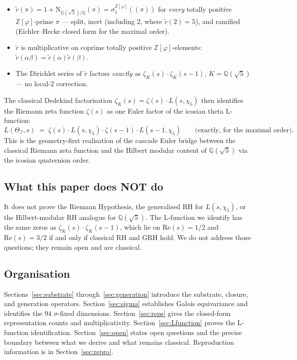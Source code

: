 \documentclass[11pt,a4paper]{article}
\theoremstyle{definition}
\theoremstyle{remark}
\newcommand{\Z}{\mathbb{Z}}
\newcommand{\Q}{\mathbb{Q}}
\newcommand{\II}{\mathcal{I}}
\newcommand{\NQ}{\mathrm{N}_{\mathbb{Q}(\sqrt{5})/\mathbb{Q}}}
\newcommand{\Zphi}{\Z[\varphi]}
\begin{document}
\begin{itemize}
  \item $\widetilde r(\pi) = 1 + \NQ(\pi) = \sigma_1^{\Zphi}((\pi))$ for
    \emph{every} totally positive $\Zphi$-prime $\pi$ --- split, inert
    (including $2$, where $\widetilde r(2)=5$), and ramified
    (Eichler--Hecke closed form for the maximal order).
  \item $\widetilde r$ is multiplicative on coprime totally positive
    $\Zphi$-elements: $\widetilde r(\alpha\beta) = \widetilde r(\alpha)\widetilde r(\beta)$.
  \item The Dirichlet series of $\widetilde r$ factors \emph{exactly} as
    $\zeta_K(s)\!\cdot\!\zeta_K(s-1)$, $K = \Q(\sqrt 5)$ --- no local-$2$ correction.
\end{itemize}

The classical Dedekind factorisation $\zeta_K(s) = \zeta(s)\!\cdot\! L(s,\chi_5)$
then identifies the Riemann zeta function $\zeta(s)$ as one Euler factor of
the icosian theta L-function:
\[
  L(\Theta_\II, s) \;=\; \zeta(s)\!\cdot\! L(s,\chi_5)\!\cdot\! \zeta(s-1)\!\cdot\! L(s-1, \chi_5)
  \qquad \text{(exactly, for the maximal order).}
\]
This is the geometry-first realisation of the cascade Euler bridge
between the classical Riemann zeta function and the Hilbert modular
content of $\Q(\sqrt 5)$ via the icosian quaternion order.

\subsection*{What this paper does NOT do}

It does not prove the Riemann Hypothesis, the generalised RH for $L(s,\chi_5)$,
or the Hilbert-modular RH analogue for $\Q(\sqrt 5)$. The L-function we
identify has the same zeros as $\zeta_K(s)\cdot\zeta_K(s-1)$, which lie on
$\mathrm{Re}(s)=1/2$ and $\mathrm{Re}(s)=3/2$ if and only if classical RH and
GRH hold. We do not address those questions; they remain open and are
classical.

\subsection*{Organisation}

Sections~\ref{sec:substrate} through~\ref{sec:generation} introduce the
substrate, closure, and generation operators. Section~\ref{sec:sigma}
establishes Galois equivariance and identifies the $94$ $\sigma$-fixed
dimensions. Section~\ref{sec:reps} gives the closed-form representation
counts and multiplicativity. Section~\ref{sec:Lfunction} proves the L-function
identification. Section~\ref{sec:open} states open questions and the precise
boundary between what we derive and what remains classical. Reproduction
information is in Section~\ref{sec:repro}.
\end{document}
